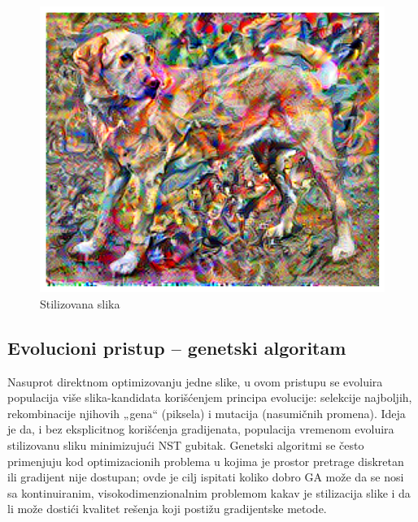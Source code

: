 \documentclass[a4paper,12pt]{article}
\begin{document}
\begin{figure}[h]
\begin{minipage}{0.32\textwidth}
    \includegraphics[width=\linewidth]{adam.png}
    {Stilizovana slika}
\end{minipage}
\end{figure}

\subsection{Evolucioni pristup -- genetski algoritam}
Nasuprot direktnom optimizovanju jedne slike, u ovom pristupu se evoluira populacija više slika-kandidata korišćenjem principa evolucije: selekcije najboljih, rekombinacije njihovih „gena“ (piksela) i mutacija (nasumičnih promena). Ideja je da, i bez eksplicitnog korišćenja gradijenata, populacija vremenom evoluira stilizovanu sliku minimizujući NST gubitak. Genetski algoritmi se često primenjuju kod optimizacionih problema u kojima je prostor pretrage diskretan ili gradijent nije dostupan; ovde je cilj ispitati koliko dobro GA može da se nosi sa kontinuiranim, visokodimenzionalnim problemom kakav je stilizacija slike i da li može dostići kvalitet rešenja koji postižu gradijentske metode.
\end{document}
